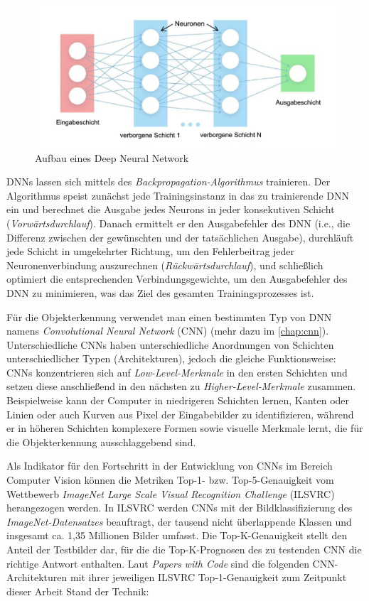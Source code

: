 \begin{figure}[!hb]
	\centering
	\includegraphics[width=\linewidth]{images/DNN}
	\caption{Aufbau eines Deep Neural Network \protect\cite{AufbauDNN}}
	\label{fig:DNN}
\end{figure}

DNNs lassen sich mittels des \emph{Backpropagation-Algorithmus} \cite{backpropapaper,Goodfellow-et-al-2016} trainieren. Der Algorithmus speist zunächst jede Trainingsinstanz in das zu trainierende DNN ein und berechnet die Ausgabe jedes Neurons in jeder konsekutiven Schicht (\emph{Vorwärtsdurchlauf}). Danach ermittelt er den Ausgabefehler des DNN (i.e., die Differenz zwischen der gewünschten und der tatsächlichen Ausgabe), durchläuft jede Schicht in umgekehrter Richtung, um den Fehlerbeitrag jeder Neuronenverbindung auszurechnen (\emph{Rückwärtsdurchlauf}), und schließlich optimiert die entsprechenden Verbindungsgewichte, um den Ausgabefehler des DNN zu minimieren, was das Ziel des gesamten Trainingsprozesses ist.

Für die Objekterkennung verwendet man einen bestimmten Typ von DNN namens \emph{Convolutional Neural Network} (CNN) (mehr dazu im \autoref{chap:cnn}). Unterschiedliche CNNs haben unterschiedliche Anordnungen von Schichten unterschiedlicher Typen (Architekturen), jedoch die gleiche Funktionsweise: CNNs konzentrieren sich auf \emph{Low-Level-Merkmale} in den ersten Schichten und setzen diese anschließend in den nächsten zu \emph{Higher-Level-Merkmale} zusammen. Beispielweise kann der Computer in niedrigeren Schichten lernen, Kanten oder Linien oder auch Kurven aus Pixel der Eingabebilder zu identifizieren, während er in höheren Schichten komplexere Formen sowie visuelle Merkmale lernt, die für die Objekterkennung ausschlaggebend sind.

Als Indikator für den Fortschritt in der Entwicklung von CNNs im Bereich Computer Vision können die Metriken Top-1- bzw. Top-5-Genauigkeit vom Wettbewerb \emph{ImageNet Large Scale Visual Recognition Challenge} (ILSVRC) \cite{russakovsky2015imagenet} herangezogen werden. In ILSVRC werden CNNs mit der Bildklassifizierung des \emph{ImageNet-Datensatzes} beauftragt, der tausend nicht überlappende Klassen und insgesamt ca. 1,35 Millionen Bilder umfasst. Die Top-K-Genauigkeit stellt den Anteil der Testbilder dar, für die die Top-K-Prognosen des zu testenden CNN die richtige Antwort enthalten. Laut \emph{Papers with Code} \cite{PapersWithCode-ImageNet} sind die folgenden CNN-Architekturen mit ihrer jeweiligen ILSVRC Top-1-Genauigkeit zum Zeitpunkt dieser Arbeit Stand der Technik:

